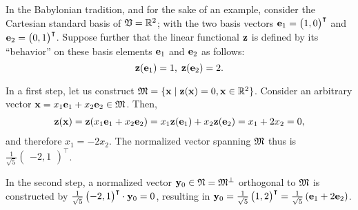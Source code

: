 {\color{blue}
\bexample
In the Babylonian tradition,
and for the sake of an example,
consider the Cartesian standard basis of ${\frak V} = \mathbb{R}^2$;
with the two basis vectors
${\bf e}_1 =\begin{pmatrix} 1,0\end{pmatrix}^\intercal $ and
${\bf e}_2 =\begin{pmatrix} 0,1\end{pmatrix}^\intercal $.
Suppose further that the linear functional ${\bf z}$ is defined by its ``behavior'' on these basis elements
${\bf e}_1$  and
${\bf e}_2$ as follows:
\begin{equation}
 {\bf z}({\bf e}_1) = 1 ,
\; {\bf z}({\bf e}_2) = 2.
\end{equation}

In a first step, let us construct
${\frak M}=\{ {\bf x} \mid {\bf z}({\bf x}) = 0, {\bf x} \in  \mathbb{R}^2\}$.
Consider an arbitrary vector ${\bf x} = x_1 {\bf e}_1 + x_2 {\bf e}_2 \in {\frak M}$.
Then,
\begin{equation}
\begin{split}
{\bf z}  ( {\bf x} )
=  {\bf z}  ( x_1 {\bf e}_1 + x_2 {\bf e}_2 )
=  x_1 {\bf z}  ( {\bf e}_1) + x_2 {\bf z}  ( {\bf e}_2 )
=  x_1  + 2 x_2 = 0
,
\end{split}
\end{equation}
and therefore $x_1 =  - 2 x_2 $.
The normalized vector spanning ${\frak M}$ thus is
$\frac{1}{\sqrt{5}} \begin{pmatrix} -2,1\end{pmatrix}^\intercal $.

In the second step, a normalized vector  ${\bf y}_0 \in  {\frak N} = {\frak M}^\perp$ orthogonal to ${\frak M}$ is constructed by
$\frac{1}{\sqrt{5}} \begin{pmatrix} -2,1\end{pmatrix}^\intercal  \cdot {\bf y}_0=0$,
resulting in
${\bf y}_0=\frac{1}{\sqrt{5}} \begin{pmatrix} 1,2\end{pmatrix}^\intercal  =
\frac{1}{\sqrt{5}} \left( {\bf e}_1 +2 {\bf e}_2 \right) $.

}
